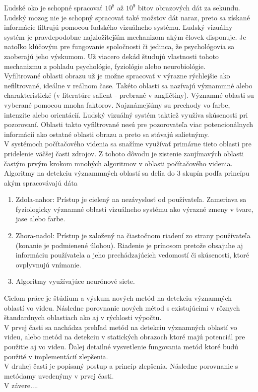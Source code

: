 
Ľudské oko je schopné spracovať \begin{math}10^8\end{math} až \begin{math}10^9\end{math} bitov obrazových dát za sekundu.
Ludský mozog nie je schopný spracovať také možstov dát naraz, preto sa získané informácie filtrujú pomocou ľudského vizuálneho systému\cite{Fmph-videnie}.
Ľudský vizuálny systém je pravdepodobne najzložitejším mechanizom akým človek disponuje.
Je natoľko klúčovým pre fungovanie spoločnosti či jedinca, že psychológovia sa zaoberajú jeho výskumom.
Už viacero dekád študujú vlastnosti tohoto mechanizmu z pohladu psychológie, fyziológie alebo neurobiológie.
\\
Vyfiltrované oblasti obrazu už je možne spracovať v výrazne rýchlejšie ako nefiltrované, ideálne v reálnom čase.
Takéto oblasti sa nazívajú význammné alebo charakteristické (v literatúre salient - prebrané v angličtiny).
Významné oblasti su vyberané pomocou mnoha faktorov.
Najznámejšímy su prechody vo farbe, intenzite alebo orientácií.
Ľudský vizuálný systém taktiež využíva skúsenosti pri pozorovaní.
Oblasti takto vyfiltrované nesú pre pozorovateľa viac potencionálnych informácií ako ostatné oblasti obrazu a preto sa stávajú salietnýmy.
\\
V systémoch počítačového videnia sa snažíme využívať primárne tieto oblasti pre pridelenie väčšej časti zdrojov.
Z tohoto dôvodu je zistenie zaujímavých oblasti častým prvým krokom mnohých algoritmov v oblasti počítačového videnia.
\\
Algoritmy na detekciu význammných oblastí sa delia do 3 skupín podľa princípu akým spracovávajú dáta\cite{brief-survey}

  \begin{enumerate}
          \item Zdola-nahor: Prístup je cielený na nezávyslosť od používateľa.
          Zameriava sa fyziologicky významné oblasti vizuálneho systému ako výrazné zmeny v tvare, jase alebo farbe.
          \item Zhora-nadol: Prístup je založený na čiastočnom riadení zo strany používateľa (konanie je podmienené úlohou).
          Riadenie je prínosom pretože obsajuhe aj informáciu používatela a jeho prechádzajúcich vedomostí či skúsenosti, ktoré ovplyvnujú vnímanie.
          \item Algoritmy využívajúce neurónové siete.
  \end{enumerate}

Cieľom práce je štúdium a výskum nových metód na detekciu významných oblastí vo videu.
Následne porovnanie nových métod s existujúcimi v rôznych štandardnych oblastiach ako aj v rýchlosti výpočtu.
\\
V prvej časti sa nachádza prehľad metód na detekciu významných oblastí vo videu, alebo metód na detekciu v statických obrazoch ktoré majú potenciál pre použitie aj vo videu.
Ďalej detailné vysvetlenie fungovania metód ktoré budú použité v implementácií zlepšenia.
\\
V druhej časti je popísaný postup a princíp zlepšenia.
Následne porovnanie s metódamy uvedenýmy v prvej časti.
\\
V závere....
